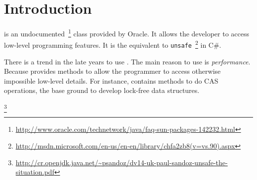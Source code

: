 
\section{Introduction} \label{sec:introduction}

\smu{} is an undocumented~\footnote{\url{http://www.oracle.com/technetwork/java/faq-sun-packages-142232.html}} class provided by Oracle.
It allows the developer to access low-level programming features.
It is the equivalent to \texttt{unsafe}~\footnote{\url{http://msdn.microsoft.com/en-us/en-en/library/chfa2zb8(v=vs.90).aspx}} in C\#.

There is a trend in the late years to use \smu{}.
The main reason to use \smu{} is \emph{performance}.
Because \smu{} provides methods to allow the programmer to access otherwise impossible low-level details.
For instance, \smu{} contains methods to do CAS operations, the base ground to develop lock-free data structures.










































































\footnote{\url{http://cr.openjdk.java.net/~psandoz/dv14-uk-paul-sandoz-unsafe-the-situation.pdf}}

